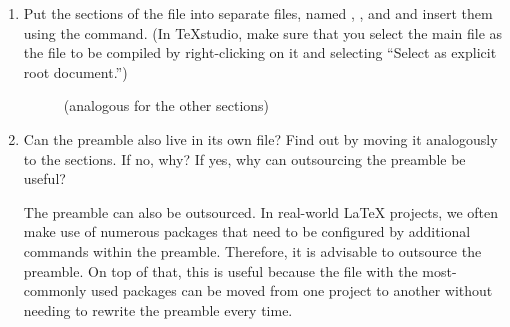 \begin{enumerate}
	\item 
	 Put the sections of the file into separate files, named 
	 , , and  and insert them using the  command. (In TeXstudio, make sure that you select the main file as the file to be compiled by right-clicking on it and selecting \enquote{Select as explicit root document.})
		
	\begin{figure}[H]
		\caption{}
	\end{figure}
	
	\begin{figure}[H]
		 \caption{ (analogous for the other 
			sections)}
	\end{figure}
	
	\item Can the preamble also live in its own file? Find out by moving it analogously to the sections. If no, why? If yes, why can outsourcing the preamble be useful?

	 The preamble can also be outsourced. In real-world \LaTeX{} projects, we often make use of numerous packages that need to be 
	 configured by additional commands within the preamble. Therefore, it is 
	 advisable to outsource the preamble. On top of that, this is useful 
	 because the file with the most-commonly used packages can be moved from 
	 one project to another without needing to rewrite the preamble every time.
\end{enumerate}